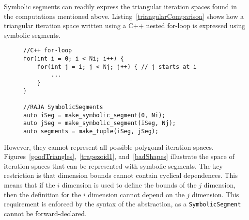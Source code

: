 Symbolic segments can readily express the triangular iteration spaces found in the computations mentioned above. 
Listing~\ref{triangularComparison} shows how a triangular iteration space written using a C++ nested for-loop is expressed using symbolic segments.

\begin{figure}
\begin{lstlisting}[caption={Comparison of C++ for-loop and RAJA \texttt{SymbolicSegment} representations of a loop nest with a triangular iteration space.},label=triangularComparison]
//C++ for-loop
for(int i = 0; i < Ni; i++) {
	for(int j = i; j < Nj; j++) { // j starts at i
		... 
	}
}

//RAJA SymbolicSegments
auto iSeg = make_symbolic_segment(0, Ni);
auto jSeg = make_symbolic_segment(iSeg, Nj);
auto segments = make_tuple(iSeg, jSeg);
\end{lstlisting}
\end{figure}

However, they cannot represent all possible polygonal iteration spaces. 
Figures~\ref{goodTriangles},~\ref{trapezoid1}, and~\ref{badShapes} illustrate the space of iteration spaces that can be represented with symbolic segments. 
The key restriction is that dimension bounds cannot contain cyclical dependences.
This means that if the $i$ dimension is used to define the bounds of the $j$ dimension, then the definition for the $i$ dimension cannot depend on the $j$ dimension. 
This requirement is enforced by the syntax of the abstraction, as a \verb.SymbolicSegment. cannot be forward-declared.

